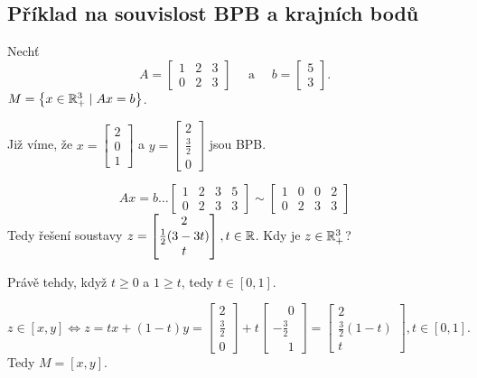 \subsection{Příklad na souvislost BPB a krajních bodů}
Nechť
\[
    A = 
    \begin{bmatrix}
    1 & 2 & 3 \\
    0 & 2 & 3
    \end{bmatrix} \quad \text{ a } \quad b = 
    \begin{bmatrix}
        5 \\
        3
    \end{bmatrix}.
\]
$M = \left\lbrace x \in \mathbb{R}^3_+ \mid Ax = b \right\rbrace$.

Již víme, že $x = 
\begin{bmatrix}
2 \\
0 \\
1    
\end{bmatrix}$ a $y = 
\begin{bmatrix}
    2 \\
    \frac{3}{2} \\
    0
\end{bmatrix}$ jsou BPB.

\[
    Ax = b \dots 
    \left[
        \begin{array}{ccc|c}
        1 & 2 & 3 & 5 \\
        0 & 2 & 3 & 3
        \end{array}
    \right] \sim
    \left[
        \begin{array}{ccc|c}
        1 & 0 & 0 & 2 \\
        0 & 2 & 3 & 3
        \end{array}
    \right]
\]
Tedy řešení soustavy $z = 
\begin{bmatrix}
2 \\
\frac{1}{2}(3-3t) \\
t
\end{bmatrix}, t \in \mathbb{R}$. Kdy je $z \in \mathbb{R}^3_+$?

Právě tehdy, když $t \geq 0$ a $1\geq t$, tedy $t \in [0,1]$.

\[
    z \in [x, y] \iff z = tx + (1-t)y = 
    \begin{bmatrix}
        2 \\
        \frac{3}{2} \\
        0
    \end{bmatrix} + t
    \begin{bmatrix}
        \phantom{-}0 \\
        -\frac{3}{2} \\
        \phantom{-}1
    \end{bmatrix} = 
    \begin{bmatrix}
        2 \\
        \frac{3}{2} (1-t) \\
        t
    \end{bmatrix}, t \in [0,1].
\]
Tedy $M = [x, y]$.

